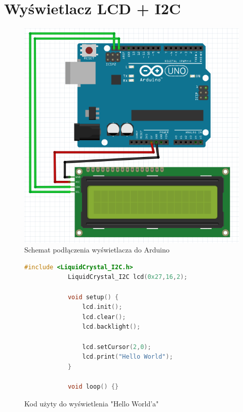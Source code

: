 \documentclass[polish,a4paper]{article}
\begin{document}
	\section{Wyświetlacz LCD + I2C}
	\begin{figure}[h!]
		\begin{center}
			\includegraphics[scale=0.42]{01_hello_world_i2c.png}
			\caption*{Schemat podłączenia wyświetlacza do Arduino}
		\end{center}
	\end{figure}
	\begin{figure}[h!]
		\begin{lstlisting}[language=C++]
			#include <LiquidCrystal_I2C.h>
			LiquidCrystal_I2C lcd(0x27,16,2);
			
			void setup() {
				lcd.init();
				lcd.clear();
				lcd.backlight();
				
				lcd.setCursor(2,0);
				lcd.print("Hello World");
			}
			
			void loop() {}
		\end{lstlisting}
		\caption*{Kod użyty do wyświetlenia "Hello World'a"}
	\end{figure}
	
	\newpage
	
\end{document}
